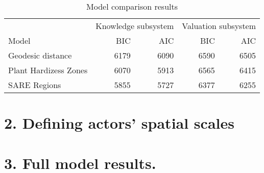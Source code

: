 \documentclass[twoside,12pt,final]{ucthesis-CA2012}
\begin{document}
\begin{ucmainmatter}
\begin{table}
\caption{\label{tab:unnamed-chunk-36}Model comparison results}
\centering
\begin{tabular}[t]{lrrrr}
\toprule
\multicolumn{1}{c}{ } & \multicolumn{2}{c}{Knowledge subsystem} & \multicolumn{2}{c}{Valuation subsystem} \\
\cmidrule(l{3pt}r{3pt}){2-3} \cmidrule(l{3pt}r{3pt}){4-5}
Model & BIC & AIC & BIC & AIC\\
\midrule
Geodesic distance & 6179 & 6090 & 6590 & 6505\\
Plant Hardizess Zones & 6070 & 5913 & 6565 & 6415\\
SARE Regions & 5855 & 5727 & 6377 & 6255\\
\bottomrule
\end{tabular}
\end{table}
\hypertarget{defining-actors-spatial-scales}{%
\section{2. Defining actors' spatial scales}\label{defining-actors-spatial-scales}}

\hypertarget{full-model-results.}{%
\section{3. Full model results.}\label{full-model-results.}}
\begin{table}


\end{table}
\end{ucmainmatter}
\end{document}
